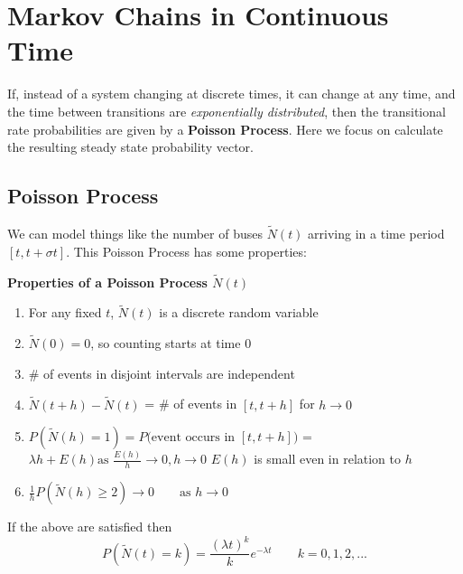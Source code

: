\documentclass[10pt,a4paper]{article}
\begin{document}
    \section{Markov Chains in Continuous Time}
    If, instead of a system changing at discrete times, it can change at any time, and the time between transitions are \emph{exponentially distributed}, then the transitional rate probabilities are given by a \textbf{Poisson Process}.  Here we focus on calculate the resulting steady state probability vector.
    \subsection{Poisson Process}
    We can model things like the number of buses $\tilde{N}(t)$ arriving in a time period $[t, t+\sigma t]$. This Poisson Process has some properties:
    \begin{framed}
\centering\textbf{Properties of a Poisson Process $\tilde{N}(t)$}
\begin{enumerate}
\item For any fixed $t$, $\tilde{N}(t)$ is a discrete random variable
\item $\tilde{N}(0) = 0$, so counting starts at time 0
\item \# of events in disjoint intervals are independent
\item $\tilde{N}(t + h) - \tilde{N}(t)$ = \# of events in $[t,t+h]$ for $h \to 0$
\item $P(\tilde{N}(h)=1) = P(\text{event occurs in $[t,t+h]$)}$ = $\lambda h + E(h) \text{as } \frac{E(h)}{h}\to 0, h \to 0$ \qquad $E(h)$ is small even in relation to $h$
\item $\frac{1}{h}P(\tilde{N}(h) \geq 2) \to 0 \qquad \text{as } h \to 0$
\end{enumerate}
If the above are satisfied then $$P(\tilde{N}(t) = k) = \frac{(\lambda t)^{k}}{k}e^{-\lambda t} \qquad k=0,1,2,...$$
\end{framed}
\end{document}
